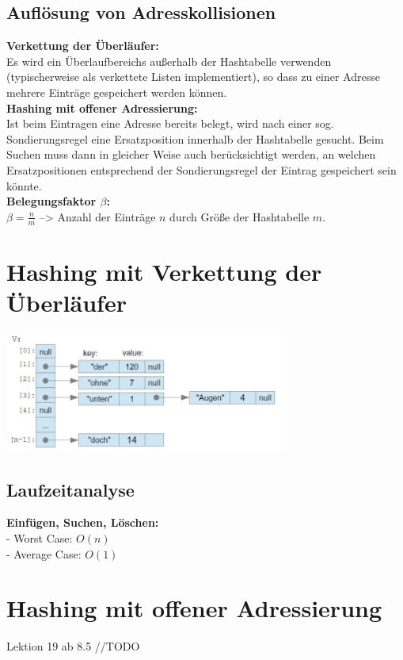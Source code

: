 \documentclass{scrreprt}
\newcommand\tab[1][1cm]{\hspace*{#1}}
\begin{document}
\subsection{Auflösung von Adresskollisionen}
\textbf{Verkettung der Überläufer:}
\\Es wird ein Überlaufbereichs außerhalb der Hashtabelle verwenden (typischerweise als verkettete Listen 
implementiert), so dass zu einer Adresse mehrere Einträge gespeichert werden können.
\\\textbf{Hashing mit offener Adressierung:}
\\Ist beim Eintragen eine Adresse bereits belegt, wird nach einer sog. Sondierungsregel eine Ersatzposition 
innerhalb der Hashtabelle gesucht. Beim Suchen muss dann in gleicher Weise auch
berücksichtigt werden, an welchen Ersatzpositionen entsprechend der Sondierungsregel der Eintrag gespeichert sein könnte.
\\\textbf{Belegungsfaktor $\beta$:}
\\\tab $\beta = \frac{n}{m}$ --> Anzahl der Einträge $n$ durch Größe der Hashtabelle $m$.
\section{Hashing mit Verkettung der Überläufer}
\includegraphics[width=0.7\textwidth]{graphics/verkettung}
\subsection{Laufzeitanalyse}
\textbf{Einfügen, Suchen, Löschen:}
\\- Worst Case: $O(n)$
\\- Average Case: $O(1)$
\section{Hashing mit offener Adressierung}
Lektion 19 ab 8.5 //TODO
\end{document}
